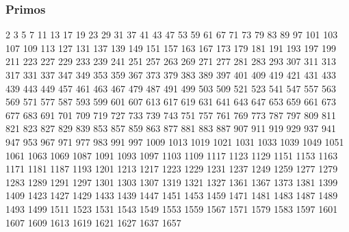 \subsubsection{Primos}
2 3 5 7 11 13 17 19 23 29
31 37 41 43 47 53 59 61 67 71
73 79 83 89 97 101 103 107 109 113
127 131 137 139 149 151 157 163 167 173
179 181 191 193 197 199 211 223 227 229
233 239 241 251 257 263 269 271 277 281
283 293 307 311 313 317 331 337 347 349
353 359 367 373 379 383 389 397 401 409
419 421 431 433 439 443 449 457 461 463
467 479 487 491 499 503 509 521 523 541
547 557 563 569 571 577 587 593 599 601
607 613 617 619 631 641 643 647 653 659
661 673 677 683 691 701 709 719 727 733
739 743 751 757 761 769 773 787 797 809
811 821 823 827 829 839 853 857 859 863
877 881 883 887 907 911 919 929 937 941
947 953 967 971 977 983 991 997 1009 1013
1019 1021 1031 1033 1039 1049 1051 1061 1063 1069
1087 1091 1093 1097 1103 1109 1117 1123 1129 1151
1153 1163 1171 1181 1187 1193 1201 1213 1217 1223
1229 1231 1237 1249 1259 1277 1279 1283 1289 1291
1297 1301 1303 1307 1319 1321 1327 1361 1367 1373
1381 1399 1409 1423 1427 1429 1433 1439 1447 1451
1453 1459 1471 1481 1483 1487 1489 1493 1499 1511
1523 1531 1543 1549 1553 1559 1567 1571 1579 1583
1597 1601 1607 1609 1613 1619 1621 1627 1637 1657
